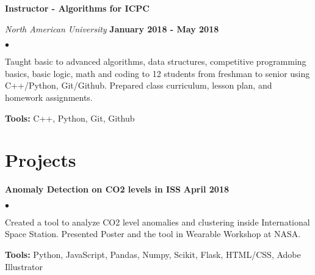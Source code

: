 \documentclass[margin,line]{res}
\newenvironment{list2}{
  \begin{list}{$\bullet$}{%
      \setlength{\itemsep}{0in}
      \setlength{\parsep}{0in} \setlength{\parskip}{0in}
      \setlength{\topsep}{0in} \setlength{\partopsep}{0in} 
      \setlength{\leftmargin}{0.2in}}}{\end{list}}
\begin{document}
\begin{resume}
{\bf Instructor - Algorithms for ICPC}

\vspace{-.3cm}
{\em North American University} \hfill {\bf January 2018 - May 2018}\\
\begin{list2}
\item Taught basic to advanced algorithms, data structures, competitive programming basics, basic logic, math and coding to 12 students from freshman to senior using C++/Python, Git/Github. Prepared class curriculum, lesson plan, and homework assignments.
\item \textbf{Tools:} C++, Python, Git, Github
\end{list2}
\vspace*{.05in}


%

%



\section{\sc Projects}

{\bf Anomaly Detection on CO2 levels in ISS} \hfill {\bf April 2018}\\
\vspace{-.3cm}
\begin{list2}
\item Created a tool to analyze CO2 level anomalies and clustering inside International Space Station. Presented Poster and the tool in Wearable Workshop at NASA.
\item \textbf{Tools:} Python, JavaScript, Pandas, Numpy, Scikit, Flask, HTML/CSS, Adobe Illustrator
\end{list2}



\end{resume}
\end{document}
